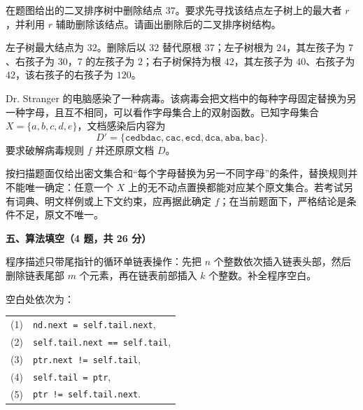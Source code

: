 \begin{question}
在题图给出的二叉排序树中删除结点 $37$。要求先寻找该结点左子树上的最大者 $r$，并利用 $r$ 辅助删除该结点。请画出删除后的二叉排序树结构。

\begin{solution}
左子树最大结点为 $32$。删除后以 $32$ 替代原根 $37$；左子树根为 $24$，其左孩子为 $7$、右孩子为 $30$，$7$ 的左孩子为 $2$；右子树保持为根 $42$，其左孩子为 $40$、右孩子为 $42$，该右孩子的右孩子为 $120$。
\end{solution}
\end{question}

\begin{question}
Dr. Stranger 的电脑感染了一种病毒。该病毒会把文档中的每种字母固定替换为另一种字母，且互不相同，可以看作字母集合上的双射函数。已知字母集合 $X=\{a,b,c,d,e\}$，文档感染后内容为
\[
D'=\{\texttt{cedbdac},\texttt{cac},\texttt{ecd},\texttt{dca},\texttt{aba},\texttt{bac}\}.
\]
要求破解病毒规则 $f$ 并还原原文档 $D$。
\begin{solution}
按扫描题面仅给出密文集合和“每个字母替换为另一不同字母”的条件，替换规则并不能唯一确定：任意一个 $X$ 上的无不动点置换都能对应某个原文集合。若考试另有词典、明文样例或上下文约束，应再据此确定 $f$；在当前题面下，严格结论是条件不足，原文不唯一。
\end{solution}
\end{question}

\textbf{五、算法填空（4 题，共 26 分）}
\begin{question}[只带尾指针的循环单链表]
程序描述只带尾指针的循环单链表操作：先把 $n$ 个整数依次插入链表头部，然后删除链表尾部 $m$ 个元素，再在链表前部插入 $k$ 个整数。补全程序空白。
\begin{solution}
空白处依次为：
\begin{center}
\small
\begin{tabular}{@{}r l@{}}
(1)&\texttt{nd.next = self.tail.next},\\
(2)&\texttt{self.tail.next == self.tail},\\
(3)&\texttt{ptr.next != self.tail},\\
(4)&\texttt{self.tail = ptr},\\
(5)&\texttt{ptr != self.tail.next}.
\end{tabular}
\end{center}
\end{solution}
\end{question}


